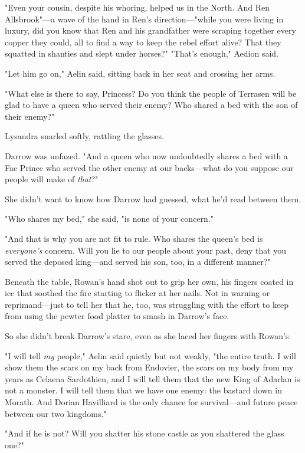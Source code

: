 "Even your cousin, despite his whoring, helped us in the North. And Ren Allsbrook"---a wave of the hand in Ren's direction---"while you were living in luxury, did you know that Ren and his grandfather were scraping together every copper they could, all to find a way to keep the rebel effort alive? That they squatted in shanties and slept under horses?" "That's enough," Aedion said.

"Let him go on," Aelin said, sitting back in her seat and crossing her arms.

"What else is there to say, Princess? Do you think the people of Terrasen will be glad to have a queen who served their enemy? Who shared a bed with the son of their enemy?"

Lysandra snarled softly, rattling the glasses.

Darrow was unfazed. "And a queen who now undoubtedly shares a bed with a Fae Prince who served the other enemy at our backs---what do you suppose our people will make of \emph{that}?"

She didn't want to know how Darrow had guessed, what he'd read between them.

"Who shares my bed," she said, "is none of your concern."

"And that is why you are not fit to rule. Who shares the queen's bed is
\emph{everyone's} concern. Will you lie to our people about your past, deny that you served the deposed king---and served his son, too, in a different manner?"

Beneath the table, Rowan's hand shot out to grip her own, his fingers coated in ice that soothed the fire starting to flicker at her nails. Not in warning or reprimand---just to tell her that he, too, was struggling with the effort to keep from using the pewter food platter to smash in Darrow's face.

So she didn't break Darrow's stare, even as she laced her fingers with Rowan's.

"I will tell \emph{my} people," Aelin said quietly but not weakly, "the entire truth. I will show them the scars on my back from Endovier, the scars on my body from my years as Celaena Sardothien, and I will tell them that the new King of Adarlan is not a monster. I will tell them that we have one enemy: the bastard down in Morath. And Dorian Havilliard is the only chance for survival---and future peace between our two kingdoms."

"And if he is not? Will you shatter his stone castle as you shattered the glass one?"

